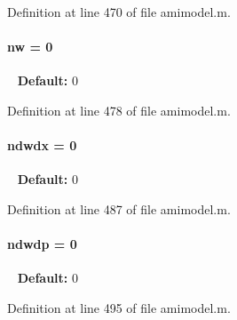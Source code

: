 Definition at line 470 of file amimodel.\+m.

\hypertarget{classamimodel_a371815f74d602ff1338376abbd1278e4}{}
\paragraph[{nw}]{\setlength{\rightskip}{0pt plus 5cm}nw = 0}\label{classamimodel_a371815f74d602ff1338376abbd1278e4}
~\newline
{\bfseries Default\+:} 0 

Definition at line 478 of file amimodel.\+m.

\hypertarget{classamimodel_ae6c1afb5529f1cc0ff56552f94e7a2b5}{}
\paragraph[{ndwdx}]{\setlength{\rightskip}{0pt plus 5cm}ndwdx = 0}\label{classamimodel_ae6c1afb5529f1cc0ff56552f94e7a2b5}
~\newline
{\bfseries Default\+:} 0 

Definition at line 487 of file amimodel.\+m.

\hypertarget{classamimodel_aa8af9048cd0280059bed9ef8999ecffb}{}
\paragraph[{ndwdp}]{\setlength{\rightskip}{0pt plus 5cm}ndwdp = 0}\label{classamimodel_aa8af9048cd0280059bed9ef8999ecffb}
~\newline
{\bfseries Default\+:} 0 

Definition at line 495 of file amimodel.\+m.


